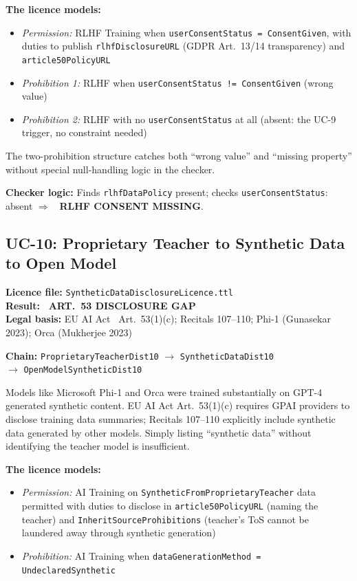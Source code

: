 \documentclass[12pt,a4paper]{article}
\newcommand{\violated}[1]{\textcolor{violation}{\textbf{\texttimes\ #1}}}
\begin{document}
\textbf{The licence models:}
\begin{itemize}[noitemsep]
  \item \emph{Permission:} RLHF Training when \texttt{userConsentStatus = ConsentGiven}, with duties to publish \texttt{rlhfDisclosureURL} (GDPR Art.\ 13/14 transparency) and \texttt{article50PolicyURL}
  \item \emph{Prohibition 1:} RLHF when \texttt{userConsentStatus != ConsentGiven} (wrong value)
  \item \emph{Prohibition 2:} RLHF with no \texttt{userConsentStatus} at all (absent: the UC-9 trigger, no constraint needed)
\end{itemize}

The two-prohibition structure catches both ``wrong value'' and ``missing property'' without special null-handling logic in the checker.

\textbf{Checker logic:} Finds \texttt{rlhfDataPolicy} present; checks \texttt{userConsentStatus}: absent $\Rightarrow$ \violated{RLHF CONSENT MISSING}.

\subsection{UC-10: Proprietary Teacher to Synthetic Data to Open Model}
\textbf{Licence file:} \texttt{SyntheticDataDisclosureLicence.ttl}\\[2pt]
\textbf{Result:} \violated{ART.\ 53 DISCLOSURE GAP}\\[4pt]
\textbf{Legal basis:} EU AI Act~\cite{euaiact2024} Art.\ 53(1)(c); Recitals 107--110; Phi-1 (Gunasekar 2023); Orca (Mukherjee 2023)

\textbf{Chain:} \texttt{ProprietaryTeacherDist10} $\rightarrow$ \texttt{SyntheticDataDist10}\\
\quad$\rightarrow$ \texttt{OpenModelSyntheticDist10}

Models like Microsoft Phi-1 and Orca were trained substantially on GPT-4 generated synthetic content. EU AI Act Art.\ 53(1)(c) requires GPAI providers to disclose training data summaries; Recitals 107--110 explicitly include synthetic data generated by other models. Simply listing ``synthetic data'' without identifying the teacher model is insufficient.

\textbf{The licence models:}
\begin{itemize}[noitemsep]
  \item \emph{Permission:} AI Training on \texttt{SyntheticFromProprietaryTeacher} data permitted with duties to disclose in \texttt{article50PolicyURL} (naming the teacher) and \texttt{InheritSourceProhibitions} (teacher's ToS cannot be laundered away through synthetic generation)
  \item \emph{Prohibition:} AI Training when \texttt{dataGenerationMethod = UndeclaredSynthetic}
\end{itemize}
\end{document}
